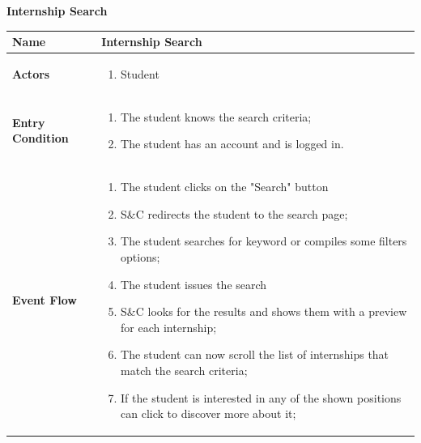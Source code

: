 \begin{enumerate}[label=\textbf{[US\arabic*]}, left = 0pt, align = left, resume]
            \newpage
            \item \textbf{Internship Search}
            
            \begin{longtable}{|l|p{11cm}|}  
                \hline
                \textbf{Name} & 
                    \textbf{Internship Search} \\
                \hline
                
                \textbf{Actors} & 
                    \begin{enumerate}[label=\textbullet, itemsep=0em]
                        \item Student
                    \end{enumerate} \\
                \hline
               
                \textbf{Entry Condition} & 
                    \begin{enumerate}[label=\textbullet, itemsep=0em]
                        \item The student knows the search criteria;
                        \item The student has an account and is logged in.
                    \end{enumerate} \\
                \hline
                
                \textbf{Event Flow} &
                    \begin{enumerate}[label=\arabic*., itemsep=0.2em]
                        \item The student clicks on the "Search" button
                        \item S\&C redirects the student to the search page;
                        \item The student searches for keyword or compiles some filters options;
                        \item The student issues the search
                        \item S\&C looks for the results and shows them with a preview for each internship;
                        \item The student can now scroll the list of internships that match the search criteria;
                        \item If the student is interested in any of the shown positions can click to discover more about it;
                    \end{enumerate} \\
                \hline
                

\end{longtable}
\end{enumerate}
